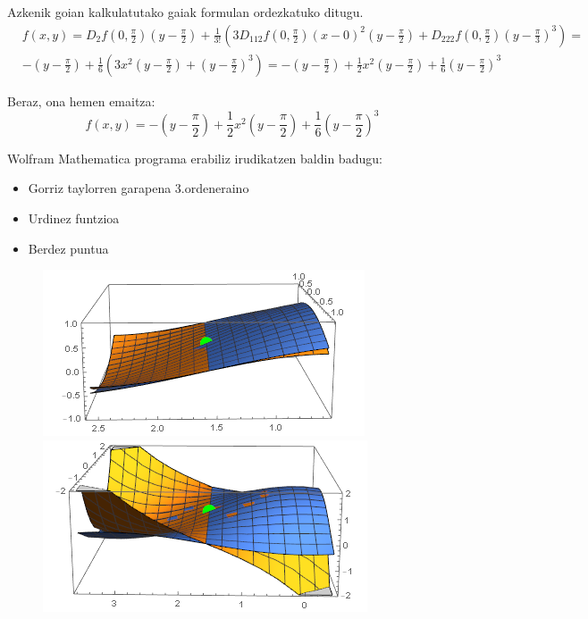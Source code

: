 Azkenik goian kalkulatutako gaiak formulan ordezkatuko ditugu.
\begin{align*}
    &f(x,y)=D_2f(0,\frac{\pi}{2})\left(y-\frac{\pi}{2}\right)+\frac{1}{3!}\left(3D_{112}f(0,\frac{\pi}{2})(x-0)^2(y-\frac{\pi}{2})+ D_{222}f(0,\frac{\pi}{2})(y-\frac{\pi}{3})^3 \right)=\\
    &-\left(y-\frac{\pi}{2}\right)+\frac{1}{6}\left(3x^2(y-\frac{\pi}{2})+(y-\frac{\pi}{2})^3\right)=-\left(y-\frac{\pi}{2}\right)+\frac{1}{2}x^2\left(y-\frac{\pi}{2}\right)+\frac{1}{6}\left(y-\frac{\pi}{2}\right)^3
\end{align*}


Beraz, ona hemen emaitza:
\begin{equation*}
    \boxed{f(x,y)=-\left(y-\frac{\pi}{2}\right)+\frac{1}{2}x^2\left(y-\frac{\pi}{2}\right)+\frac{1}{6}\left(y-\frac{\pi}{2}\right)^3}
\end{equation*}

Wolfram Mathematica programa erabiliz irudikatzen baldin badugu:
\begin{itemize}
    \item Gorriz taylorren garapena 3.ordeneraino
    \item Urdinez funtzioa
    \item Berdez puntua 
\end{itemize}

\begin{figure}[h]
    \includegraphics[scale=0.5]{2.ariketa Taylor-1.png}
    \includegraphics[scale=0.5]{2.ariketa Taylor-2.png}
    \label{fig:my_label}
\end{figure}

